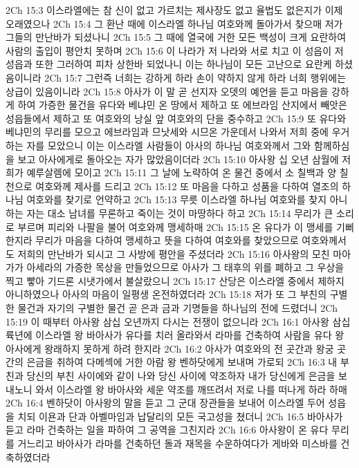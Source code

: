 2Ch 15:3  이스라엘에는 참 신이 없고 가르치는 제사장도 없고 율법도 없은지가 이제 오래였으나
2Ch 15:4  그 환난 때에 이스라엘 하나님 여호와께 돌아가서 찾으매 저가 그들의 만난바가 되셨나니
2Ch 15:5  그 때에 열국에 거한 모든 백성이 크게 요란하여 사람의 출입이 평안치 못하며
2Ch 15:6  이 나라가 저 나라와 서로 치고 이 성읍이 저 성읍과 또한 그러하여 피차 상한바 되었나니 이는 하나님이 모든 고난으로 요란케 하셨음이니라
2Ch 15:7  그런즉 너희는 강하게 하라 손이 약하지 않게 하라 너희 행위에는 상급이 있음이니라
2Ch 15:8  아사가 이 말 곧 선지자 오뎃의 예언을 듣고 마음을 강하게 하여 가증한 물건을 유다와 베냐민 온 땅에서 제하고 또 에브라임 산지에서 빼앗은 성읍들에서 제하고 또 여호와의 낭실 앞 여호와의 단을 중수하고
2Ch 15:9  또 유다와 베냐민의 무리를 모으고 에브라임과 므낫세와 시므온 가운데서 나와서 저희 중에 우거하는 자를 모았으니 이는 이스라엘 사람들이 아사의 하나님 여호와께서 그와 함께하심을 보고 아사에게로 돌아오는 자가 많았음이더라
2Ch 15:10  아사왕 십 오년 삼월에 저희가 예루살렘에 모이고
2Ch 15:11  그 날에 노략하여 온 물건 중에서 소 칠백과 양 칠천으로 여호와께 제사를 드리고
2Ch 15:12  또 마음을 다하고 성품을 다하여 열조의 하나님 여호와를 찾기로 언약하고
2Ch 15:13  무릇 이스라엘 하나님 여호와를 찾지 아니하는 자는 대소 남녀를 무론하고 죽이는 것이 마땅하다 하고
2Ch 15:14  무리가 큰 소리로 부르며 피리와 나팔을 불어 여호와께 맹세하매
2Ch 15:15  온 유다가 이 맹세를 기뻐한지라 무리가 마음을 다하여 맹세하고 뜻을 다하여 여호와를 찾았으므로 여호와께서도 저희의 만난바가 되시고 그 사방에 평안을 주셨더라
2Ch 15:16  아사왕의 모친 마아가가 아세라의 가증한 목상을 만들었으므로 아사가 그 태후의 위를 폐하고 그 우상을 찍고 빻아 기드론 시냇가에서 불살랐으니
2Ch 15:17  산당은 이스라엘 중에서 제하지 아니하였으나 아사의 마음이 일평생 온전하였더라
2Ch 15:18  저가 또 그 부친의 구별한 물건과 자기의 구별한 물건 곧 은과 금과 기명들을 하나님의 전에 드렸더니
2Ch 15:19  이 때부터 아사왕 삼십 오년까지 다시는 전쟁이 없으니라
2Ch 16:1  아사왕 삼십 륙년에 이스라엘 왕 바아사가 유다를 치러 올라와서 라마를 건축하여 사람을 유다 왕 아사에게 왕래하지 못하게 하려 한지라
2Ch 16:2  아사가 여호와의 전 곳간과 왕궁 곳간의 은금을 취하여 다메섹에 거한 아람 왕 벤하닷에게 보내며 가로되
2Ch 16:3  내 부친과 당신의 부친 사이에와 같이 나와 당신 사이에 약조하자 내가 당신에게 은금을 보내노니 와서 이스라엘 왕 바아사와 세운 약조를 깨뜨려서 저로 나를 떠나게 하라 하매
2Ch 16:4  벤하닷이 아사왕의 말을 듣고 그 군대 장관들을 보내어 이스라엘 두어 성읍을 치되 이욘과 단과 아벨마임과 납달리의 모든 국고성을 쳤더니
2Ch 16:5  바아사가 듣고 라마 건축하는 일을 파하여 그 공역을 그친지라
2Ch 16:6  아사왕이 온 유다 무리를 거느리고 바아사가 라마를 건축하던 돌과 재목을 수운하여다가 게바와 미스바를 건축하였더라
